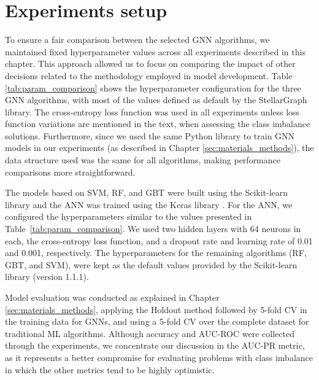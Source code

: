 \section{Experiments setup}

To ensure a fair comparison between the selected GNN algorithms, we maintained fixed hyperparameter values across all experiments described in this chapter. This approach allowed us to focus on comparing the impact of other decisions related to the methodology employed in model development. Table \ref{tab:param_comparison} shows the hyperparameter configuration for the three GNN algorithms, with most of the values defined as default by the StellarGraph library. The cross-entropy loss function was used in all experiments unless loss function variations are mentioned in the text, \eg when assessing the class imbalance solutions. Furthermore, since we used the same Python library to train GNN models in our experiments (as described in Chapter \ref{sec:materials_methods}), the data structure used was the same for all algorithms, making performance comparisons more straightforward. 



The models based on SVM, RF, and GBT were built using the Scikit-learn library \cite{scikit-learn} and the ANN was trained using the Keras library \cite{chollet2015keras}. For the ANN, we configured the hyperparameters similar to the values presented in Table~\ref{tab:param_comparison}. We used two hidden layers with 64 neurons in each, the cross-entropy loss function, and a dropout rate and learning rate of 0.01 and 0.001, respectively. The hyperparameters for the remaining algorithms (\ie RF, GBT, and SVM), were kept as the default values provided by the Scikit-learn library (version 1.1.1).


Model evaluation was conducted as explained in Chapter \ref{sec:materials_methods}, applying the Holdout method followed by 5-fold CV in the training data for GNNs, and using a 5-fold CV over the complete dataset for traditional ML algorithms. Although accuracy and AUC-ROC were collected through the experiments, we concentrate our discussion in the AUC-PR metric, as it represents a better compromise for evaluating problems with class imbalance in which the other metrics tend to be highly optimistic.

